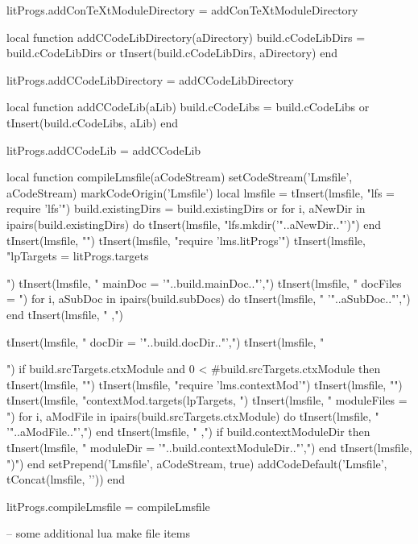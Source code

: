 litProgs.addConTeXtModuleDirectory = addConTeXtModuleDirectory

local function addCCodeLibDirectory(aDirectory)
  build.cCodeLibDirs = build.cCodeLibDirs or { }
  tInsert(build.cCodeLibDirs, aDirectory)
end

litProgs.addCCodeLibDirectory = addCCodeLibDirectory

local function addCCodeLib(aLib)
  build.cCodeLibs = build.cCodeLibs or { }
  tInsert(build.cCodeLibs, aLib)
end

litProgs.addCCodeLib = addCCodeLib
\stopLuaCode

\startMkIVCode
\def\compileLmsfile#1{
  \directlua{
    thirddata.literateProgs.compileLmsfile('#1')
  }
}
\stopMkIVCode

\startLuaCode
local function compileLmsfile(aCodeStream)
  setCodeStream('Lmsfile', aCodeStream)
  markCodeOrigin('Lmsfile')
  local lmsfile = {}
  tInsert(lmsfile, "lfs = require 'lfs'\n")
  build.existingDirs = build.existingDirs or { }
  for i, aNewDir in ipairs(build.existingDirs) do
    tInsert(lmsfile, "lfs.mkdir('"..aNewDir.."')")
  end
  tInsert(lmsfile, "")
  tInsert(lmsfile, "require 'lms.litProgs'\n")
  tInsert(lmsfile, "lpTargets = litProgs.targets{")
  tInsert(lmsfile, "  mainDoc  = '"..build.mainDoc.."',")
  tInsert(lmsfile, "  docFiles = {")
  for i, aSubDoc in ipairs(build.subDocs) do
    tInsert(lmsfile, "    '"..aSubDoc.."',")
  end
  tInsert(lmsfile, "  },")

  tInsert(lmsfile, "  docDir    = '"..build.docDir.."',")
  tInsert(lmsfile, "}")
  if build.srcTargets.ctxModule and 0 < #build.srcTargets.ctxModule then
    tInsert(lmsfile, "")
    tInsert(lmsfile, "require 'lms.contextMod'")
    tInsert(lmsfile, "")
    tInsert(lmsfile, "contextMod.targets(lpTargets, {")
      tInsert(lmsfile, "  moduleFiles = {")
      for i, aModFile in ipairs(build.srcTargets.ctxModule) do
        tInsert(lmsfile, "    '"..aModFile.."',")
      end
      tInsert(lmsfile, "  },")
      if build.contextModuleDir then
        tInsert(lmsfile, "  moduleDir = '"..build.contextModuleDir.."',")
      end
    tInsert(lmsfile, "})")
  end
  setPrepend('Lmsfile', aCodeStream, true)
  addCodeDefault('Lmsfile', tConcat(lmsfile, '\n'))
end

litProgs.compileLmsfile = compileLmsfile
\stopLuaCode

\startLmsfile
-- some additional lua make file items
\stopLmsfile

\stopchapter